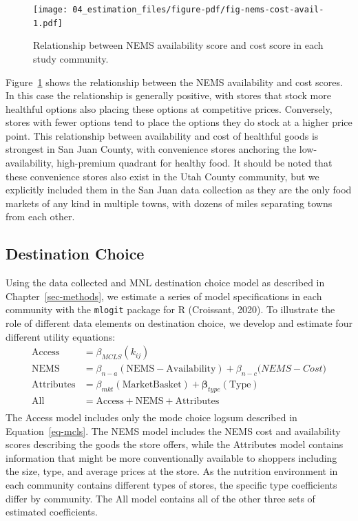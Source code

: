 \documentclass[
  letterpaper,
  authoryear,
  review,
  3p]{elsarticle}
\begin{document}
\begin{figure}

{\centering \texttt{[image: 04\_estimation\_files/figure-pdf/fig-nems-cost-avail-1.pdf]}

}

\caption{\label{fig-nems-cost-avail}Relationship between NEMS
availability score and cost score in each study community.}

\end{figure}

Figure~\ref{fig-nems-cost-avail} shows the relationship between the NEMS
availability and cost scores. In this case the relationship is generally
positive, with stores that stock more healthful options also placing
these options at competitive prices. Conversely, stores with fewer
options tend to place the options they do stock at a higher price point.
This relationship between availability and cost of healthful goods is
strongest in San Juan County, with convenience stores anchoring the
low-availability, high-premium quadrant for healthy food. It should be
noted that these convenience stores also exist in the Utah County
community, but we explicitly included them in the San Juan data
collection as they are the only food markets of any kind in multiple
towns, with dozens of miles separating towns from each other.

\hypertarget{sec-estimation}{%
\subsection{Destination Choice}\label{sec-estimation}}

Using the data collected and MNL destination choice model as described
in Chapter~\ref{sec-methods}, we estimate a series of model
specifications in each community with the \texttt{mlogit} package for R
(Croissant, 2020). To illustrate the role of different data elements on
destination choice, we develop and estimate four different utility
equations: \begin{align*}
\mathrm{Access} &= \beta_{MCLS}( k_{ij})\\
\mathrm{NEMS} &= \beta_{n-a} (\mathrm{NEMS-Availability}) + \beta_{n-c}\mathrm({NEMS-Cost})\\
\mathrm{Attributes} &= \beta_{mkt} (\mathrm{Market Basket}) + \mathbf{\beta}_{type}(\mathrm{Type})\\
\mathrm{All} &= \mathrm{Access} + \mathrm{NEMS} + \mathrm{Attributes}\\
\end{align*} The Access model includes only the mode choice logsum
described in Equation~\ref{eq-mcls}. The NEMS model includes the NEMS
cost and availability scores describing the goods the store offers,
while the Attributes model contains information that might be more
conventionally available to shoppers including the size, type, and
average prices at the store. As the nutrition environment in each
community contains different types of stores, the specific type
coefficients differ by community. The All model contains all of the
other three sets of estimated coefficients.
\end{document}
